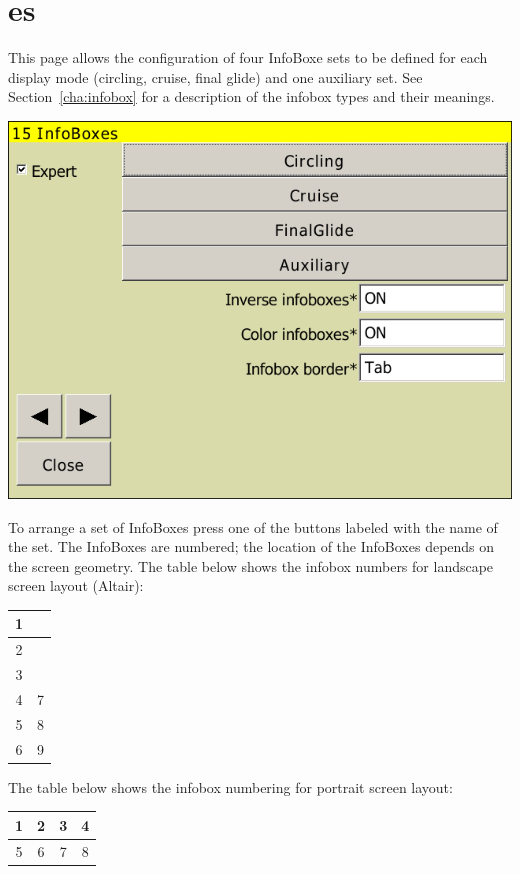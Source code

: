 \documentclass[a4paper,12pt]{refrep}
\begin{document}

\clearpage
\section{{\InfoBox}es}

This page allows the configuration of four InfoBoxe sets to be defined for each
display mode (circling, cruise, final glide) and one auxiliary set.  See
Section~\ref{cha:infobox} for a description of the infobox types and their meanings.

\begin{center}
\includegraphics[angle=0,width=0.8\linewidth,keepaspectratio='true']{figures/config-infoboxes.png}
\end{center}

To arrange a set of InfoBoxes press one of the buttons labeled with the name
of the set.  The InfoBoxes are numbered; the location of the InfoBoxes depends
on the screen geometry.  The table below shows the infobox numbers for landscape screen layout (Altair):

\begin{tabular}{|c|c|}
\hline
1 &  \\
\hline
2 &  \\
\hline
3 &  \\
\hline
4 & 7 \\
\hline
5 & 8 \\
\hline
6 & 9 \\
\hline
\end{tabular}

The table below shows the infobox numbering for portrait screen layout:

\begin{tabular}{|c|c|c|c|}
\hline
1 & 2 & 3 & 4 \\
\hline
\hline
5 & 6 & 7 & 8 \\
\hline
\end{tabular}
\end{document}
